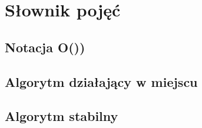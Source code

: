 \chapter{Słownik pojęć}

\section{Notacja O())}

\section{Algorytm działający w miejscu}

\section{Algorytm stabilny}
